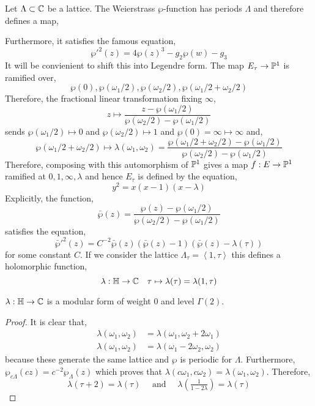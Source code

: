 \documentclass[12pt]{article}
\begin{document}
Let $\Lambda \subset \CC$ be a lattice. The Weierstrass $\wp$-function has periods $\Lambda$ 
and therefore defines a map,
\begin{center}
\end{center}
Furthermore, it satisfies the famous equation,
\[ \wp'^2(z) = 4 \wp(z)^3 - g_2 \wp(w) - g_3 \]
It will be convienient to shift this into Legendre form. The map $E_\tau \to \P^1$ is ramified over,
\[ \wp(0), \wp(\omega_1/2), \wp(\omega_2/2), \wp(\omega_1 / 2 + \omega_2 / 2) \]
Therefore, the fractional linear transformation fixing $\infty$,
\[ z \mapsto \frac{z - \wp(\omega_1/2)}{\wp(\omega_2/2) - \wp(\omega_1/2)} \]
sends $\wp(\omega_1/2) \mapsto 0$ and $\wp(\omega_2/2) \mapsto 1$ and $\wp(0) = \infty \mapsto \infty$ and,
\[ \wp(\omega_1/2 + \omega_2/2) \mapsto \lambda(\omega_1, \omega_2) = \frac{\wp(\omega_1/2+\omega_2/2) - \wp(\omega_1/2)}{\wp(\omega_2/2) - \wp(\omega_1/2)} \]
Therefore, composing with this automorphism of $\P^1$ gives a map $f : E \to \P^1$ ramified at $0,1,\infty, \lambda$ and hence $E_\tau$ is defined by the equation,
\[ y^2 = x(x-1)(x-\lambda) \]
Explicitly, the function,
\[ \bar{\wp}(z) = \frac{\wp(z) - \wp(\omega_1/2)}{\wp(\omega_2/2) - \wp(\omega_1/2)} \]
satisfies the equation, 
\[ \bar{\wp}'^2(z) = C^{-2} \bar{\wp}(z) (\bar{\wp}(z) - 1)(\bar{\wp}(z) - \lambda(\tau)) \]
for some constant $C$. If we consider the lattice $\Lambda_{\tau} = \left< 1, \tau \right>$ this defines a holomorphic function,
\[ \lambda : \bH \to \CC \quad \tau \mapsto \lambda(\tau) = \lambda(1, \tau) \]

\begin{prop}
$\lambda : \bH \to \CC$ is a modular form of weight $0$ and level $\Gamma(2)$. 
\end{prop}

\begin{proof}
It is clear that,
\begin{align*}
\lambda(\omega_1, \omega_2) &= \lambda(\omega_1, \omega_2 + 2 \omega_1)
\\
\lambda(\omega_1, \omega_2) & = \lambda(\omega_1 - 2 \omega_2, \omega_2) 
\end{align*} 
because these generate the same lattice and $\wp$ is periodic for $\Lambda$. Furthermore, $\wp_{c \Lambda}(cz) = c^{-2} \wp_{\Lambda}(z)$ which proves that $\lambda(c \omega_1, c \omega_2) = \lambda(\omega_1, \omega_2)$. Therefore, \[ \lambda(\tau + 2) = \lambda(\tau) \quad \text{ and } \quad \lambda \left(\tfrac{1}{1 - 2 \lambda} \right) = \lambda(\tau) \]
\end{proof}
\end{document}
